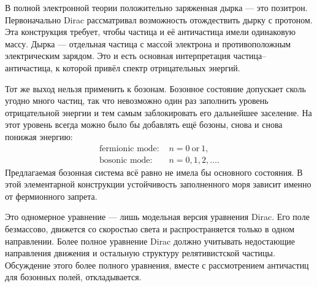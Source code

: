 В полной электронной теории положительно заряженная дырка — это позитрон. Первоначально Dirac рассматривал возможность отождествить дырку с протоном. Эта конструкция требует, чтобы частица и её античастица имели одинаковую массу. Дырка — отдельная частица с массой электрона и противоположным электрическим зарядом. Это и есть основная интерпретация частица--античастица, к которой привёл спектр отрицательных энергий.

Тот же выход нельзя применить к бозонам. Бозонное состояние допускает сколь угодно много частиц, так что невозможно один раз заполнить уровень отрицательной энергии и тем самым заблокировать его дальнейшее заселение. На этот уровень всегда можно было бы добавлять ещё бозоны, снова и снова понижая энергию:
\begin{equation}
\begin{aligned}
\text{fermionic mode: }&n=0\ \text{or}\ 1,\\
\text{bosonic mode: }&n=0,1,2,\ldots .
\end{aligned}
\end{equation}
Предлагаемая бозонная система всё равно не имела бы основного состояния. В этой элементарной конструкции устойчивость заполненного моря зависит именно от фермионного запрета.

Это одномерное уравнение — лишь модельная версия уравнения Dirac. Его поле безмассово, движется со скоростью света и распространяется только в одном направлении. Более полное уравнение Dirac должно учитывать недостающие направления движения и остальную структуру релятивистской частицы. Обсуждение этого более полного уравнения, вместе с рассмотрением античастиц для бозонных полей, откладывается.
